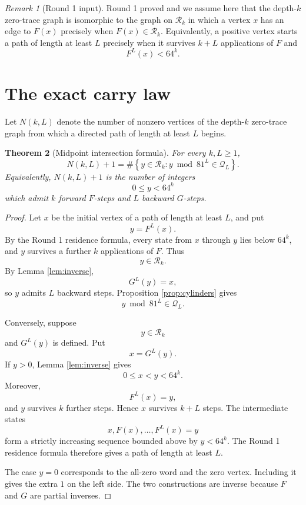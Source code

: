 \documentclass[11pt]{article}
\newtheorem{theorem}{Theorem}[section]
\theoremstyle{remark}
\newtheorem{remark}[theorem]{Remark}
\newcommand{\Rset}{\mathcal{R}}
\newcommand{\Qset}{\mathcal{Q}}
\begin{document}
\begin{remark}[Round 1 input]
\label{rem:round1}
Round 1 proved and we assume here that the depth-\(k\) zero-trace graph is isomorphic to the graph on \(\Rset_k\) in which a vertex \(x\) has an edge to \(F(x)\) precisely when \(F(x)\in\Rset_k\).  Equivalently, a positive vertex starts a path of length at least \(L\) precisely when it survives \(k+L\) applications of \(F\) and
\[
F^L(x)<64^k.
\]
\end{remark}

\section{The exact carry law}

Let \(N(k,L)\) denote the number of nonzero vertices of the depth-\(k\) zero-trace graph from which a directed path of length at least \(L\) begins.

\begin{theorem}[Midpoint intersection formula]
\label{thm:midpoint}
For every \(k,L\ge1\),
\[
N(k,L)+1
=
\#\left\{
y\in\Rset_k:
y\bmod81^L\in\Qset_L
\right\}.
\]
Equivalently, \(N(k,L)+1\) is the number of integers
\[
0\le y<64^k
\]
which admit \(k\) forward \(F\)-steps and \(L\) backward \(G\)-steps.
\end{theorem}

\begin{proof}
Let \(x\) be the initial vertex of a path of length at least \(L\), and put
\[
y=F^L(x).
\]
By the Round 1 residence formula, every state from \(x\) through \(y\) lies below \(64^k\), and \(y\) survives a further \(k\) applications of \(F\).  Thus
\[
y\in\Rset_k.
\]
By Lemma \ref{lem:inverse},
\[
G^L(y)=x,
\]
so \(y\) admits \(L\) backward steps.  Proposition \ref{prop:cylinders} gives
\[
y\bmod81^L\in\Qset_L.
\]

Conversely, suppose
\[
y\in\Rset_k
\]
and \(G^L(y)\) is defined.  Put
\[
x=G^L(y).
\]
If \(y>0\), Lemma \ref{lem:inverse} gives
\[
0\le x<y<64^k.
\]
Moreover,
\[
F^L(x)=y,
\]
and \(y\) survives \(k\) further steps.  Hence \(x\) survives \(k+L\) steps.  The intermediate states
\[
x,F(x),\ldots,F^L(x)=y
\]
form a strictly increasing sequence bounded above by \(y<64^k\).  The Round 1 residence formula therefore gives a path of length at least \(L\).

The case \(y=0\) corresponds to the all-zero word and the zero vertex.  Including it gives the extra \(1\) on the left side.  The two constructions are inverse because \(F\) and \(G\) are partial inverses.
\end{proof}
\end{document}

